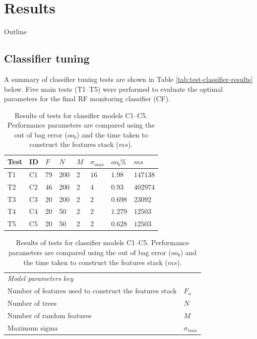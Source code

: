 \chapter{Results}\label{chp6:results}
\begin{remark}{Outline}
\end{remark}

\section{Classifier tuning}\label{sec:classifier-tuning}
A summary of classifier tuning tests are shown in Table \ref{tab:test-classifier-results} below. Five main tests (T1--T5) were performed to evaluate the optimal parameters for the final RF monitoring classifier (CF).

\begin{table}[!htbp] \myfloatalign \caption[Performance results of test  models.]{Results of tests for classifier models C1--C5. Performance parameters are compared using the out of bag error ($ oo_b $) and the time taken to construct the features stack ($ ms $).}\label{tab:test-classifier-models-results} 
	\begin{tabular}{p{.4in}p{.4in}p{.4in}p{.4in}p{.4in}p{.4in}p{.4in}p{.4in}} \toprule
	Test & ID & $ F $ & $ N $ & $ M $ & $\sigma_{max}$ & $ oo_b \% $ &  $ ms $ \\ \midrule
	T1& C1 & 79 & 200 & 2 & $16$ & $1.98$ & $147138$\\
	T2& C2 & 46 & 200 & 2 & $4$ & $0.93$ & $402974$ \\
	T3& C3 & 20 & 200 & 2 & $2$ &  $0.698$ & $23092$ \\
	T4& C4 & 20 & 50 & 2 & $2 $ & $1.279$ & $12503$ \\
	T5& C5 & 20 & 50 & 2 & $2 $ & $0.628$ & $12503$ \\ \bottomrule
	\end{tabular}
	\begin{tabular}{ll} \\
\emph{Model parameters key} & \\
Number of features used to construct the features stack & $ F_{n} $\\
Number of trees & $ N $\\
Number of random features & $ M $\\
Maximum sigma & $\sigma_{max}$\\
	\end{tabular}
\end{table}


